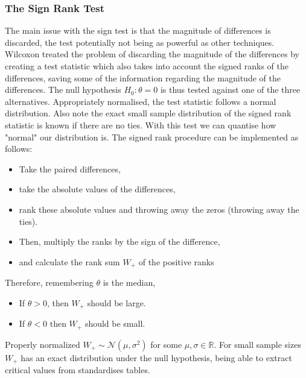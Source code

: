 \documentclass{homework}
\begin{document}
\subsubsection{The Sign Rank Test}

The main issue with the sign test is that the magnitude of differences is discarded, the test potentially not being as powerful as other techniques. \\

Wilcoxon treated the problem of discarding the magnitude of the differences by creating a test statistic which also takes into account the signed ranks of the differences, saving some of the information regarding the magnitude of the differences. The null hypothesis $H_0: \theta = 0$ is thus tested against one of the three alternatives. Appropriately normalised, the test statistic follows a normal distribution. Also note the exact small sample distribution of the signed rank statistic is known if there are no ties. With this test we can quantise how "normal" our distribution is. The signed rank procedure can be implemented as follows:

\begin{itemize}
    \item Take the paired differences, 
    \item take the absolute values of the differences, \item rank these absolute values and throwing away the zeros (throwing away the ties).
    \item Then, multiply the ranks by the sign of the difference, 
    \item and calculate the rank sum $W_+$ of the positive ranks
\end{itemize}

Therefore, remembering $\theta$ is the median,

\begin{itemize}
    \item If $\theta > 0$, then $W_+$ should be large.
    \item If $\theta < 0$ then $W_+$ should be small.
\end{itemize}

Properly normalized $W_+ \sim \mathcal{N}(\mu, \sigma^2)$ for some $\mu, \sigma \in \mathds{R}$. For small sample sizes $W_+$ has an exact distribution under the null hypothesis, being able to extract critical values from standardises tables.\\
\end{document}
